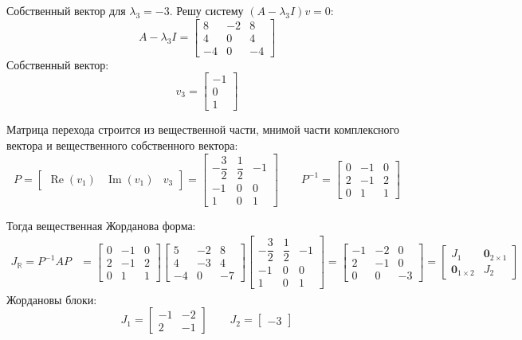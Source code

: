 \documentclass[a4paper,12pt]{article}
\begin{document}
	Собственный вектор для $\lambda_3 = -3$. Решу систему $(A - \lambda_3 I)v = 0$:
	\[
	A - \lambda_3 I = 
	\begin{bmatrix}
		8 & -2 & 8 \\
		4 & 0 & 4 \\
		-4 & 0 & -4
	\end{bmatrix}
	\]
	Собственный вектор:
	\[
	v_3 = \begin{bmatrix} -1 \\ 0 \\ 1 \end{bmatrix}
	\]
	
	Матрица перехода строится из вещественной части, мнимой части 
	комплексного вектора и вещественного собственного вектора:
	\[
	P = \begin{bmatrix} \operatorname{Re}(v_1) & \operatorname{Im}(v_1) & v_3 \end{bmatrix}
	= \begin{bmatrix} 
		-\dfrac{3}{2} & \dfrac{1}{2} & -1 \\ 
		-1 & 0 & 0 \\ 
		1 & 0 & 1 
	\end{bmatrix} \qquad
	P^{-1} = \begin{bmatrix} 
		0 & -1 & 0 \\ 
		2 & -1 & 2 \\ 
		0 &  1 & 1 
	\end{bmatrix}
	\]
	
	Тогда вещественная Жорданова форма:
	\begin{align*}
		J_{\mathbb{R}} = P^{-1}AP &= 
		\begin{bmatrix} 0 & -1 & 0 \\ 2 & -1 & 2 \\ 0 & 1 & 1 \end{bmatrix}
		\begin{bmatrix} 5 & -2 & 8 \\ 4 & -3 & 4 \\ -4 & 0 & -7 \end{bmatrix}
		\begin{bmatrix} -\dfrac{3}{2} & \dfrac{1}{2} & -1 \\ -1 & 0 & 0 \\ 1 & 0 & 1 \end{bmatrix} 
		= \begin{bmatrix} -1 & -2 & 0 \\ 2 & -1 & 0 \\ 0 & 0 & -3 \end{bmatrix}
		= \begin{bmatrix} J_1 & \mathbf{0}_{2\times1}  \\
			\mathbf{0}_{1\times2} & J_2  \end{bmatrix}
	\end{align*}
	Жордановы блоки:
	\[
	J_1 = \begin{bmatrix} -1 & -2 \\ 2 & -1 \end{bmatrix} \qquad J_2 = \begin{bmatrix} -3 \end{bmatrix}
	\]
	
\end{document}
